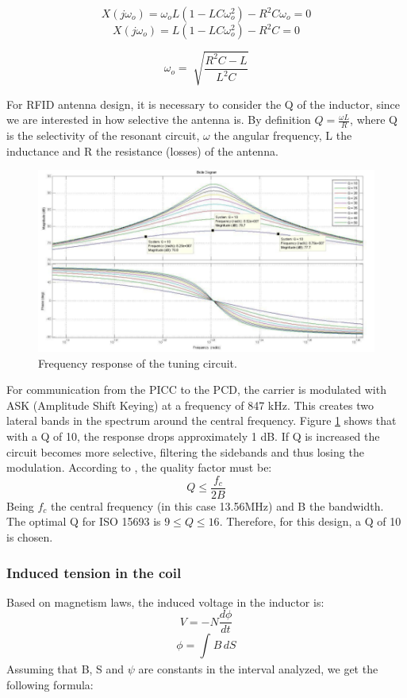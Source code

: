 \documentclass{article} %
\begin{document}
\begin{multicols}{2}
$$X(j\omega _o) = \omega _o L(1 - LC\omega _o ^2)-R^2C\omega _o = 0$$
$$X(j\omega _o) = L(1 - LC\omega _o ^2)-R^2C = 0$$

\begin{equation}
\omega _o = \sqrt[]{\frac{R ^2C - L}{L^2C}}
\end{equation}

For RFID antenna design, it is necessary to consider the Q of the inductor, since we are interested in how selective the antenna is. By definition $Q = \frac{\omega L}{R}$, where Q is the selectivity of the resonant circuit, $\omega$  the angular frequency, L the inductance and R the resistance (losses) of the antenna.

\begin{figure}[H]
\centering
\includegraphics[scale=0.25]{Images/ImagenesTesina/antena/Respuesta_Frecuencia.png}
\caption{Frequency response of the tuning circuit.}
\label{fig:transf_frec}
\end{figure}

For communication from the PICC to the PCD, the carrier is modulated with ASK (Amplitude Shift Keying) at a frequency of 847 kHz. This creates two lateral bands in the spectrum around the central frequency. Figure \ref{fig:transf_frec} shows that with a Q of 10, the response drops approximately 1 dB. If Q is increased the circuit becomes more selective, filtering the sidebands and thus losing the modulation. According to  \cite{c8}, the quality factor must be:
\begin{equation}
{Q \leq \frac{f_c}{2B}}
\end{equation}
Being $f_c$ the central frequency (in this case 13.56MHz) and B the bandwidth. The optimal Q for ISO 15693 is $9\leq Q\leq 16$.
Therefore, for this design, a Q of 10 is chosen.

\subsubsection{Induced tension in the coil}
Based on magnetism laws, the induced voltage in the inductor is:
\begin{equation}
V = -N\frac{d\phi}{dt}
\end{equation}
\begin{equation}
\phi = \int_{}^{}  B \, dS
\end{equation}
Assuming that B, S and $\psi$ are constants in the interval analyzed, we get the following formula:


\end{multicols}
\end{document}
